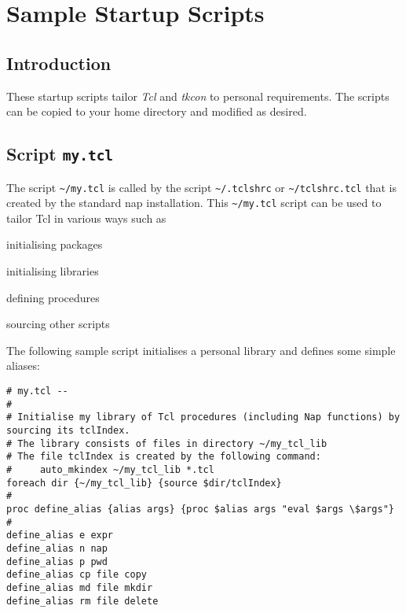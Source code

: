 
\section{Sample Startup Scripts}
    \label{scripts}
    \label{scripts-Sample-Startup-Scripts}

\subsection{Introduction}
    \label{scripts-Introduction}

These startup scripts tailor 
  \emph{Tcl} and 
  \emph{tkcon} to personal requirements. The scripts can be copied to
  your home directory and modified as desired.

\subsection{Script \texttt{my.tcl}}
    \label{scripts-my}

The script 
  \verb!~/my.tcl! is called by the script 
  \verb!~/.tclshrc! or 
  \verb!~/tclshrc.tcl! that is created by the standard nap
  installation. This 
  \verb!~/my.tcl! script can be used to tailor Tcl in various
  ways such as
\begin{bullets}
    \item initialising packages
    \item initialising libraries
    \item defining procedures
    \item sourcing other scripts
\end{bullets}
  
 The following sample script initialises a personal library and
  defines some simple aliases:
  \begin{verbatim}
# my.tcl --
#
# Initialise my library of Tcl procedures (including Nap functions) by
sourcing its tclIndex.
# The library consists of files in directory ~/my_tcl_lib
# The file tclIndex is created by the following command:
#     auto_mkindex ~/my_tcl_lib *.tcl
foreach dir {~/my_tcl_lib} {source $dir/tclIndex}
#
proc define_alias {alias args} {proc $alias args "eval $args \$args"}
#
define_alias e expr
define_alias n nap
define_alias p pwd
define_alias cp file copy
define_alias md file mkdir
define_alias rm file delete
\end{verbatim}

